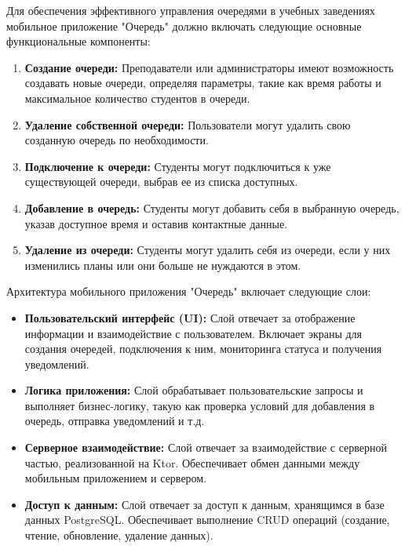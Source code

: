 

Для обеспечения эффективного управления очередями в учебных заведениях мобильное приложение "Очередь" должно включать следующие основные функциональные компоненты:

\begin{enumerate}
	\item \textbf{Создание очереди:} Преподаватели или администраторы
		имеют возможность создавать новые очереди, определяя параметры,
		такие как время работы и максимальное количество студентов в очереди.
	\item \textbf{Удаление собственной очереди:} Пользователи могут удалить
		свою созданную очередь по необходимости.
	\item \textbf{Подключение к очереди:} Студенты могут подключиться
		к уже существующей очереди, выбрав ее из списка доступных.
	\item \textbf{Добавление в очередь:} Студенты могут добавить себя
		в выбранную очередь, указав доступное время
		и оставив контактные данные.
	\item \textbf{Удаление из очереди:} Студенты могут удалить себя из очереди,
		если у них изменились планы или они больше не нуждаются в этом.
\end{enumerate}


Архитектура мобильного приложения "Очередь" включает следующие слои:

\begin{itemize}
    \item \textbf{Пользовательский интерфейс (UI):} Слой отвечает
		за отображение информации и взаимодействие с пользователем.
		Включает экраны для создания очередей, подключения к ним,
		мониторинга статуса и получения уведомлений.
    \item \textbf{Логика приложения:} Слой обрабатывает пользовательские
		запросы и выполняет бизнес-логику, такую как проверка условий
		для добавления в очередь, отправка уведомлений и т.д.
    \item \textbf{Серверное взаимодействие:} Слой отвечает за взаимодействие
		с серверной частью, реализованной на Ktor.
		Обеспечивает обмен данными между мобильным приложением и сервером.
    \item \textbf{Доступ к данным:} Слой отвечает за доступ к данным,
		хранящимся в базе данных PostgreSQL.
		Обеспечивает выполнение CRUD операций
		(создание, чтение, обновление, удаление данных).
\end{itemize}


